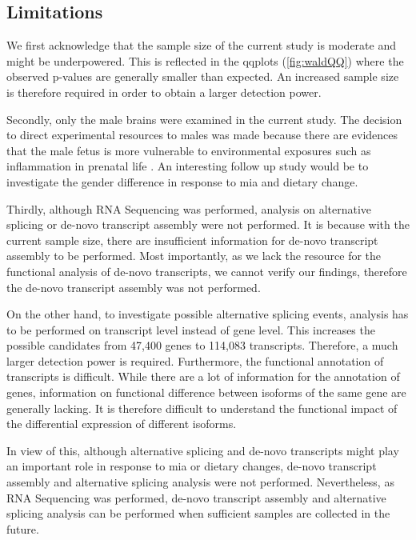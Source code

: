 \subsection{Limitations}
We first acknowledge that the sample size of the current study is moderate and might be underpowered.
This is reflected in the \glspl{qqplot} (\cref{fig:waldQQ}) where the observed p-values are generally smaller than expected.
An increased sample size is therefore required in order to obtain a larger detection power. 

Secondly, only the male brains were examined in the current study. 
The decision to direct experimental resources to males was made because there are evidences that the male fetus is more vulnerable to environmental exposures such as inflammation in prenatal life \citep{Bergeron2013,Lein2007}. 
An interesting follow up study would be to investigate the gender difference in response to \gls{mia} and dietary change.

Thirdly, although RNA Sequencing was performed, analysis on alternative splicing or de-novo transcript assembly were not performed.
It is because with the current sample size, there are insufficient information for de-novo transcript assembly to be performed. 
Most importantly, as we lack the resource for the functional analysis of de-novo transcripts, we cannot verify our findings, therefore the de-novo transcript assembly was not performed. 

On the other hand, to investigate possible alternative splicing events, analysis has to be performed on transcript level instead of gene level. 
This increases the possible candidates from 47,400 genes to 114,083 transcripts.
Therefore, a much larger detection power is required. 
Furthermore, the functional annotation of transcripts is difficult.
While there are a lot of information for the annotation of genes, information on functional difference between isoforms of the same gene are generally lacking. 
It is therefore difficult to understand the functional impact of the differential expression of different isoforms. 

In view of this, although alternative splicing and de-novo transcripts might play an important role in response to \gls{mia} or dietary changes, de-novo transcript assembly and alternative splicing analysis were not performed. 
Nevertheless, as RNA Sequencing was performed, de-novo transcript assembly and alternative splicing analysis can be performed when sufficient samples are collected in the future. 

